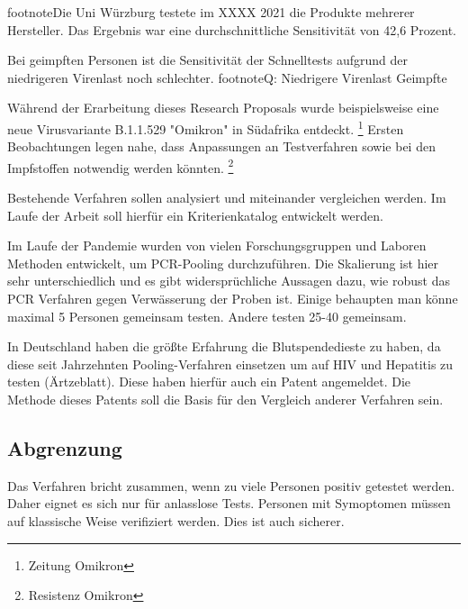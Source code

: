 footnote{Die Uni Würzburg testete im XXXX 2021 die Produkte mehrerer Hersteller.
	Das Ergebnis war eine durchschnittliche Sensitivität von 42,6 Prozent.}

Bei geimpften Personen ist die Sensitivität der Schnelltests aufgrund der niedrigeren Virenlast noch schlechter.
footnote{Q: Niedrigere Virenlast Geimpfte}

Während der Erarbeitung dieses Research Proposals wurde beispielsweise eine neue Virusvariante B.1.1.529 "Omikron" in Südafrika entdeckt.
\footnote{Zeitung Omikron}
Ersten Beobachtungen legen nahe, dass Anpassungen an Testverfahren sowie bei den Impfstoffen notwendig werden könnten.
\footnote{Resistenz Omikron}

Bestehende Verfahren sollen analysiert und miteinander vergleichen werden.
Im Laufe der Arbeit soll hierfür ein Kriterienkatalog entwickelt werden.

Im Laufe der Pandemie wurden von vielen Forschungsgruppen und Laboren Methoden entwickelt, um PCR-Pooling durchzuführen. Die Skalierung ist hier sehr unterschiedlich und es gibt widersprüchliche Aussagen dazu, wie robust das PCR Verfahren gegen Verwässerung der Proben ist. Einige behaupten man könne maximal 5 Personen gemeinsam testen. Andere testen 25-40 gemeinsam.

In Deutschland haben die größte Erfahrung die Blutspendedieste zu haben, da diese seit Jahrzehnten Pooling-Verfahren einsetzen um auf HIV und Hepatitis zu testen (Ärtzeblatt). Diese haben hierfür auch ein Patent angemeldet. Die Methode dieses Patents soll die Basis für den Vergleich anderer Verfahren sein.

\subsection{Abgrenzung}
Das Verfahren bricht zusammen, wenn zu viele Personen positiv getestet werden.
Daher eignet es sich nur für anlasslose Tests.
Personen mit Symoptomen müssen auf klassische Weise verifiziert werden. Dies ist auch sicherer.
\fi